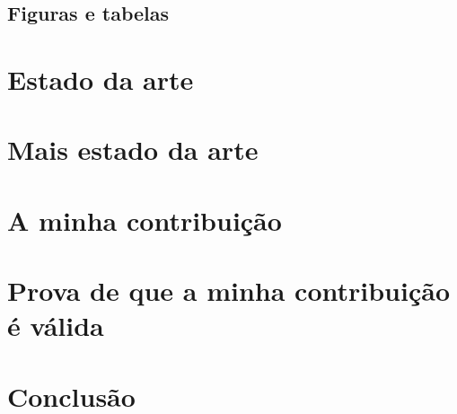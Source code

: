 \documentclass[cic,tc]{iiufrgs}
\begin{document}
\section{Figuras e tabelas}

\chapter{Estado da arte}

\chapter{Mais estado da arte}

\chapter{A minha contribuição}

\chapter{Prova de que a minha contribuição é válida}

\chapter{Conclusão}




\end{document}
